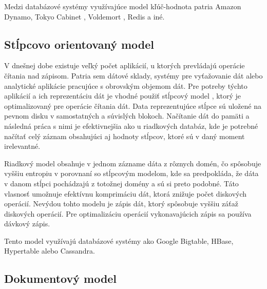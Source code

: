 \documentclass[11pt,twoside,a4paper]{book}
\begin{document}
Medzi databázové systémy využívajúce model kľúč-hodnota patria Amazon Dynamo, Tokyo Cabinet \cite{TODO}, Voldemort \cite{TODO}, Redis \cite{TODO} a iné.

\subsection{Stĺpcovo orientovaný model}


V dnešnej dobe existuje veľký počet aplikácií, u ktorých prevládajú operácie čítania nad zápisom. Patria sem dátové sklady, systémy pre vyťažovanie dát alebo analytické aplikácie pracujúce s obrovským objemom dát. Pre potreby týchto aplikácií a ich reprezentáciu dát je vhodné použiť stĺpcový model \cite{abadi2009column, abadi2009}, ktorý je optimalizovaný pre operácie čítania dát. Data reprezentujúce stĺpce sú uložené na pevnom disku v samostatných a súvislých blokoch. Načítanie dát do pamäti a následná práca s nimi je efektivnejšia ako u riadkových databáz, kde je potrebné načítať celý záznam obsahujúci aj hodnoty stĺpcov, ktoré sú v daný moment irelevantné.

Riadkový model obsahuje v jednom zázname dáta z rôznych domén, čo spôsobuje vyššiu entropiu v porovnaní so stĺpcovým modelom, kde sa predpokláda, že dáta v danom stĺpci pochádzajú z totožnej domény a sú si preto podobné. Táto vlasnosť umožnuje efektívnu komprimáciu dát, ktorá znižuje počet diskových operácií. Nevýdou tohto modelu je zápis dát, ktorý spôsobuje vyššiu záťaž diskových operácií. Pre optimalizáciu operácií vykonavajúcich zápis sa používa dávkový zápis.


Tento model využívajú databázové systémy ako Google Bigtable, HBase, Hypertable alebo Cassandra.

\subsection{Dokumentový model}
\end{document}
